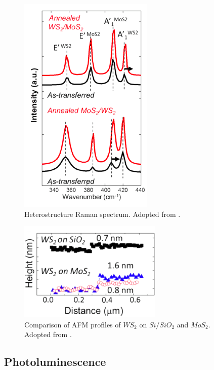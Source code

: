 \begin{figure}[H]
	\begin{center}
		\includegraphics[scale=0.9]{Heterostructures/HeterostructureRamanSpectrumIntro.png}
		\caption{Heterostructure Raman spectrum. Adopted from \cite{Tongay2014}.}
		\label{fig:HeterostructureRamanSpectrumIntro}
	\end{center}
\end{figure}

\begin{figure}[H]
	\begin{center}
		\includegraphics[scale=1]{Heterostructures/HeterostructureAFMProfile.png}
		\caption{Comparison of AFM profiles of $WS_2$ on $Si/SiO_2$ and $MoS_2$. Adopted from \cite{Tongay2014}.}
		\label{fig:HeterostructureAFMProfile}
	\end{center}
\end{figure}


\subsection{Photoluminescence}

